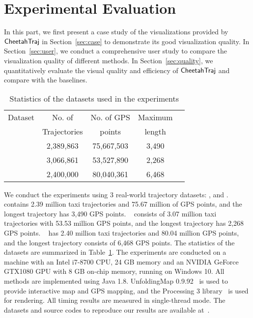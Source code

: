 \section{Experimental Evaluation}\label{sec:exp}

In this part, we first present a case study of the visualizations provided by $\mathsf{CheetahTraj}$ in Section~\ref{sec:case} to demonstrate its good visualization quality. In Section~\ref{sec:user}, we conduct a comprehensive user study to compare the visualization quality of different methods. In Section~\ref{sec:quality}, we quantitatively evaluate the visual quality and efficiency of $\mathsf{CheetahTraj}$ and compare with the baselines.

\begin{table}
	\centering
	\small
	\caption{Statistics of the datasets used in the experiments}
	\begin{tabular}{|c|c|c|c|c|} \hline
		Dataset & No. of  & No. of GPS  & Maximum  \\
                & Trajectories & points & length \\ \hline
		\pt{}& 2,389,863 & 75,667,503 & 3,490 \\ \hline
		\sz{}& 3,066,861 & 53,527,890 & 2,268 \\ \hline
		\cd{}& 2,400,000 & 80,040,361 & 6,468 \\ \hline
	\end{tabular}	\label{tab:dataset}
\end{table}


 We conduct the experiments
using 3 real-world trajectory datasets: \pt{}, \sz{} and \cd{}.
\pt{}~\cite{pt} contains 2.39 million taxi trajectories and 75.67 million of GPS points, and the longest trajectory has 3,490 GPS points.
\sz{}~\cite{sz} consists of 3.07 million taxi trajectories with 53.53 million GPS points, and the longest trajectory has 2,268 GPS points.
\cd{}~\cite{cd} has 2.40 million taxi trajectories and 80.04 million GPS points, and the longest trajectory consists of 6,468 GPS points. 
The statistics of the datasets are summarized in Table~\ref{tab:dataset}. The experiments are conducted on a machine with an Intel i7-8700 CPU, 24 GB memory and an NVIDIA GeForce GTX1080 GPU with 8 GB on-chip memory, running on Windows 10. All methods are implemented using Java 1.8. UnfoldingMap 0.9.92~\cite{ufmaps} is used to provide interactive map and GPS mapping, and the Processing 3 library~\cite{p3} is used for rendering. All timing results are measured in single-thread mode. The datasets and source codes to reproduce our results are available at~\cite{code}.

